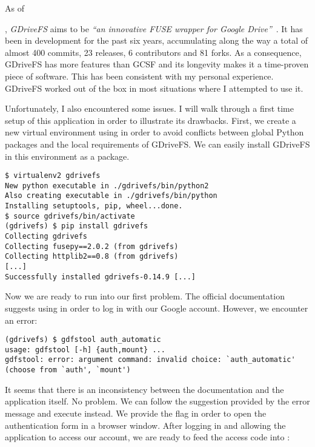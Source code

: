 As of \date{June 2018}, \emph{GDriveFS} aims to be \emph{``an innovative FUSE wrapper for Google Drive''}~\cite{dsoprea/GDriveFS}. It has been in development for the past six years, accumulating along the way a total of almost 400 commits, 23 releases, 6 contributors and 81 forks. As a consequence, GDriveFS has more features than GCSF and its longevity makes it a time-proven piece of software. This has been consistent with my personal experience. GDriveFS worked out of the box in most situations where I attempted to use it.

Unfortunately, I also encountered some issues. I will walk through a first time setup of this application in order to illustrate its drawbacks. First, we create a new virtual environment using  in order to avoid conflicts between global Python packages and the local requirements of GDriveFS. We can easily install GDriveFS in this environment as a  package.

\begin{lstlisting}[caption=Creating a virtual environment and installing GDriveFS]
$ virtualenv2 gdrivefs
New python executable in ./gdrivefs/bin/python2
Also creating executable in ./gdrivefs/bin/python
Installing setuptools, pip, wheel...done.
$ source gdrivefs/bin/activate
(gdrivefs) $ pip install gdrivefs
Collecting gdrivefs
Collecting fusepy==2.0.2 (from gdrivefs)
Collecting httplib2==0.8 (from gdrivefs)
[...]
Successfully installed gdrivefs-0.14.9 [...]
\end{lstlisting}

Now we are ready to run into our first problem. The official documentation~\cite{GDriveFS_README} suggests using  in order to log in with our Google account. However, we encounter an error:

\begin{lstlisting}[caption=GDriveFS nonexistent authentication command]
(gdrivefs) $ gdfstool auth_automatic
usage: gdfstool [-h] {auth,mount} ...
gdfstool: error: argument command: invalid choice: `auth_automatic' (choose from `auth', `mount')
\end{lstlisting}

It seems that there is an inconsistency between the documentation and the application itself. No problem. We can follow the suggestion provided by the error message and execute  instead. We provide the  flag in order to open the authentication form in a browser window. After logging in and allowing the application to access our account, we are ready to feed the access code into :

